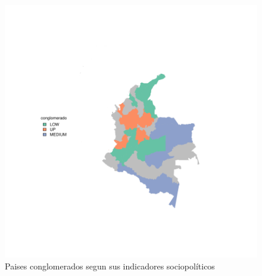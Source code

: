 \documentclass{article}
\begin{document}
\begin{figure}[h]
\centering
\begin{adjustbox}{width=6cm,height=4cm,clip,trim=1cm 2.5cm 0cm 2.5cm}
\includegraphics{ProyectoFINAL-getMapconglomerado}
\end{adjustbox}
\caption{Paises conglomerados segun sus indicadores sociopolíticos}\label{clustmap}
\end{figure}


% 
\end{document}
